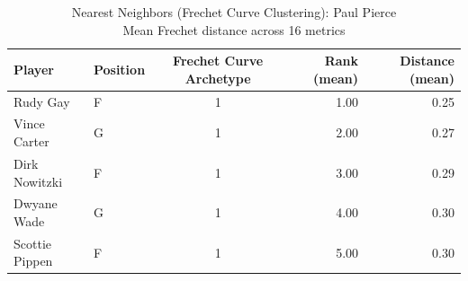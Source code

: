 \begin{table}[t]
\caption*{
{\fontsize{20}{25} Nearest Neighbors (Frechet Curve Clustering): Paul Pierce\fontsize{12}{15}\selectfont } \\ 
{\fontsize{14}{17}\selectfont  Mean Frechet distance across 16 metrics\fontsize{12}{15}\selectfont }
} 
\fontsize{12.0pt}{14.0pt}\selectfont
\begin{tabular*}{\linewidth}{@{\extracolsep{\fill}}llcrr}
\toprule
Player & Position & Frechet Curve Archetype & Rank (mean) & Distance (mean) \\ 
\midrule\addlinespace[2.5pt]
Rudy Gay & F & 1 & 1.00 & 0.25 \\ 
Vince Carter & G & 1 & 2.00 & 0.27 \\ 
Dirk Nowitzki & F & 1 & 3.00 & 0.29 \\ 
Dwyane Wade & G & 1 & 4.00 & 0.30 \\ 
Scottie Pippen & F & 1 & 5.00 & 0.30 \\ 
\bottomrule
\end{tabular*}
\end{table}

